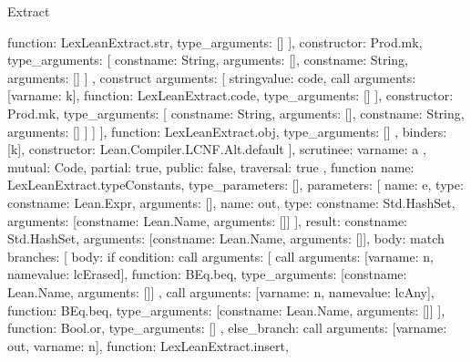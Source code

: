 \begin{lexlean}{Extract}
\begin{toolingmodule}
{{{{{{{{                          function: LexLeanExtract.str,
                          type_arguments: []
                        }
                      ],
                      constructor: Prod.mk,
                      type_arguments: [
                        const{name: String, arguments: []},
                        const{name: String, arguments: []}
                      ]
                    },
                    construct{
                      arguments: [
                        string{value: code},
                        call{
                          arguments: [var{name: k}],
                          function: LexLeanExtract.code,
                          type_arguments: []
                        }
                      ],
                      constructor: Prod.mk,
                      type_arguments: [
                        const{name: String, arguments: []},
                        const{name: String, arguments: []}
                      ]
                    }
                  ]
                }
              ],
              function: LexLeanExtract.obj,
              type_arguments: []
            },
            binders: [k],
            constructor: Lean.Compiler.LCNF.Alt.default
          }
        ],
        scrutinee: var{name: a}
      },
      mutual: Code,
      partial: true,
      public: false,
      traversal: true
    },
    function{
      name: LexLeanExtract.typeConstants,
      type_parameters: [],
      parameters: [
        {name: e, type: const{name: Lean.Expr, arguments: []}},
        {
          name: out,
          type: const{name: Std.HashSet, arguments: [const{name: Lean.Name, arguments: []}]}
        }
      ],
      result: const{name: Std.HashSet, arguments: [const{name: Lean.Name, arguments: []}]},
      body: match{
        branches: [
          {
            body: if{
              condition: call{
                arguments: [
                  call{
                    arguments: [var{name: n}, name{value: lcErased}],
                    function: BEq.beq,
                    type_arguments: [const{name: Lean.Name, arguments: []}]
                  },
                  call{
                    arguments: [var{name: n}, name{value: lcAny}],
                    function: BEq.beq,
                    type_arguments: [const{name: Lean.Name, arguments: []}]
                  }
                ],
                function: Bool.or,
                type_arguments: []
              },
              else_branch: call{
                arguments: [var{name: out}, var{name: n}],
                function: LexLeanExtract.insert,
}}}}}}
\end{toolingmodule}
\end{lexlean}
